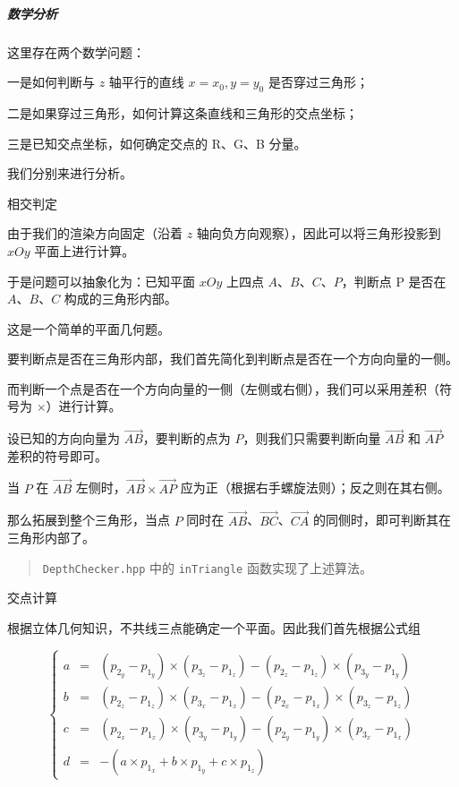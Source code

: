 \documentclass[
]{article}
\begin{document}
\hypertarget{header-n229}{%
\subparagraph{数学分析}\label{header-n229}}

这里存在两个数学问题：

一是如何判断与 \(z\) 轴平行的直线 \(x = x_0, y = y_0\) 是否穿过三角形；

二是如果穿过三角形，如何计算这条直线和三角形的交点坐标；

三是已知交点坐标，如何确定交点的 R、G、B 分量。

我们分别来进行分析。

相交判定

由于我们的渲染方向固定（沿着 \(z\)
轴向负方向观察），因此可以将三角形投影到 \(xOy\) 平面上进行计算。

于是问题可以抽象化为：已知平面 \(xOy\) 上四点
\(A\)、\(B\)、\(C\)、\(P\)，判断点 P 是否在 \(A\)、\(B\)、\(C\)
构成的三角形内部。

这是一个简单的平面几何题。

要判断点是否在三角形内部，我们首先简化到判断点是否在一个方向向量的一侧。

而判断一个点是否在一个方向向量的一侧（左侧或右侧），我们可以采用差积（符号为
\(\times\)）进行计算。

设已知的方向向量为 \(\overrightarrow{AB}\)，要判断的点为
\(P\)，则我们只需要判断向量 \(\overrightarrow{AB}\) 和
\(\overrightarrow{AP}\) 差积的符号即可。

当 \(P\) 在 \(\overrightarrow{AB}\)
左侧时，\(\overrightarrow{AB} \times \overrightarrow{AP}\)
应为正（根据右手螺旋法则）；反之则在其右侧。

那么拓展到整个三角形，当点 \(P\) 同时在
\(\overrightarrow{AB}\)、\(\overrightarrow{BC}\)、\(\overrightarrow{CA}\)
的同侧时，即可判断其在三角形内部了。

\begin{quote}
\texttt{DepthChecker.hpp} 中的 \texttt{inTriangle} 函数实现了上述算法。
\end{quote}

交点计算

根据立体几何知识，不共线三点能确定一个平面。因此我们首先根据公式组

\[\left\{
\begin{aligned}
a & = & (p_{2_y} - p_{1_y}) \times (p_{3_z} - p_{1_z}) - (p_{2_z} - p_{1_z}) \times (p_{3_y} - p_{1_y}) \\
b & = & (p_{2_z} - p_{1_z}) \times (p_{3_x} - p_{1_x}) - (p_{2_x} - p_{1_x}) \times (p_{3_z} - p_{1_z}) \\
c & = & (p_{2_x} - p_{1_x}) \times (p_{3_y} - p_{1_y}) - (p_{2_y} - p_{1_y}) \times (p_{3_x} - p_{1_x}) \\
d & = &  - (a \times p_{1_x} + b \times p_{1_y} + c \times p_{1_z})
\end{aligned}
\right.\]
\end{document}
